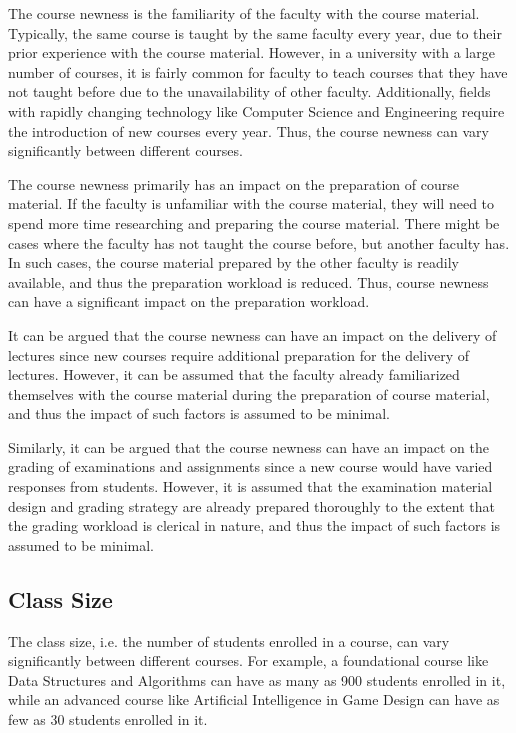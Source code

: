The course newness is the familiarity of the faculty with the course material. Typically, the same course is taught by the same faculty every year, due to their prior experience with the course material. However, in a university with a large number of courses, it is fairly common for faculty to teach courses that they have not taught before due to the unavailability of other faculty. Additionally, fields with rapidly changing technology like Computer Science and Engineering require the introduction of new courses every year. Thus, the course newness can vary significantly between different courses.

The course newness primarily has an impact on the preparation of course material. If the faculty is unfamiliar with the course material, they will need to spend more time researching and preparing the course material. There might be cases where the faculty has not taught the course before, but another faculty has. In such cases, the course material prepared by the other faculty is readily available, and thus the preparation workload is reduced. Thus, course newness can have a significant impact on the preparation workload.

It can be argued that the course newness can have an impact on the delivery of lectures since new courses require additional preparation for the delivery of lectures. However, it can be assumed that the faculty already familiarized themselves with the course material during the preparation of course material, and thus the impact of such factors is assumed to be minimal.

Similarly, it can be argued that the course newness can have an impact on the grading of examinations and assignments since a new course would have varied responses from students. However, it is assumed that the examination material design and grading strategy are already prepared thoroughly to the extent that the grading workload is clerical in nature, and thus the impact of such factors is assumed to be minimal.

\subsection{Class Size}

The class size, i.e. the number of students enrolled in a course, can vary significantly between different courses. For example, a foundational course like Data Structures and Algorithms can have as many as 900 students enrolled in it, while an advanced course like Artificial Intelligence in Game Design can have as few as 30 students enrolled in it.

